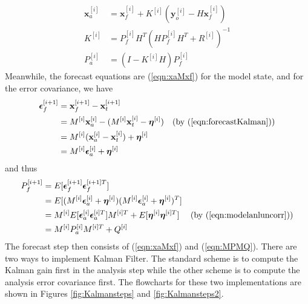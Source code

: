 \begin{subequations}
\begin{align}
\textbf{x}_a^{[i]} &= \textbf{x}_f^{[i]} + K^{[i]}(\textbf{y}_o^{[i]} - H\textbf{x}_f^{[i]}) \\
K^{[i]} &= P_f^{[i]}H^T(HP_f^{[i]}H^T + R^{[i]})^{-1} \\
P_a^{[i]} &= (I - K^{[i]}H)P_f^{[i]} 
\end{align}
\end{subequations}
Meanwhile, the forecast equations are (\ref{eqn:xaMxf}) for the model state, and for the error covariance, we have
\begin{align}
\bm{\epsilon}_f^{[i+1]} &= \textbf{x}_f^{[i+1]} - \textbf{x}_t^{[i+1]} \nonumber \\
&= M^{[i]}\textbf{x}_a^{[i]} - (M^{[i]}\textbf{x}_t^{[i]} - \bm{\eta}^{[i]}) &\text{(by (\ref{eqn:forecastKalman}))} \nonumber \\
&= M^{[i]}(\textbf{x}_a^{[i]} - \textbf{x}_t^{[i]}) + \bm{\eta}^{[i]} \nonumber \\
&= M^{[i]}\bm{\epsilon}_a^{[i]} + \bm{\eta}^{[i]}  
\end{align}
and thus
\begin{align}
P_f^{[i+1]} &= E[\bm{\epsilon}_f^{[i+1]}\bm{\epsilon}_f^{[i+1]T}] \nonumber \\
&= E[(M^{[i]}\bm{\epsilon}_a^{[i]} + \bm{\eta}^{[i]})(M^{[i]}\bm{\epsilon}_a^{[i]} + \bm{\eta}^{[i]})^T] \nonumber \\
&= M^{[i]}E[\bm{\epsilon}_a^{[i]}\bm{\epsilon}_a^{[i]T}]M^{[i]T} + E[\bm{\eta}^{[i]}\bm{\eta}^{[i]T}] &\text{(by (\ref{eqn:modelanluncorr}))} \nonumber \\
&= M^{[i]}P_a^{[i]}M^{[i]T} + Q^{[i]} \label{eqn:MPMQ}
\end{align}
The forecast step then consists of (\ref{eqn:xaMxf}) and (\ref{eqn:MPMQ}). There are two ways to implement Kalman Filter. The standard scheme is to compute the Kalman gain first in the analysis step while the other scheme is to compute the analysis error covariance first. The flowcharts for these two implementations are shown in Figures \ref{fig:Kalmansteps} and \ref{fig:Kalmansteps2}.

